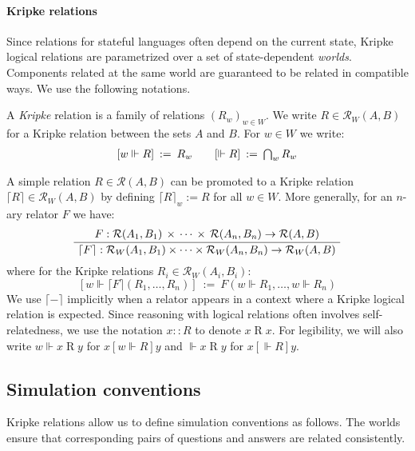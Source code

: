 \documentclass[sigplan,10pt,review]{acmart}
\newcommand{\ifr}[1]{\mathrel{[{#1}]}}
\begin{document}
\paragraph{Kripke relations}

Since relations for stateful languages
often depend on the current state,
Kripke logical relations
are parametrized over a set of state-dependent \emph{worlds}.
Components related at the same world
are guaranteed to be related in compatible ways.
We use the following notations.

\begin{definition} \label{def:klr} %
A \emph{Kripke} relation is
a family of relations $(R_w)_{w \in W}$.
We write $R \in \mathcal{R}_W(A, B)$
for a Kripke relation between the sets $A$ and $B$.
For $w \in W$ we write:
\[
\begin{array}{c@{\qquad}c}
    [w \Vdash R] \: := \: R_w &
    [\Vdash R] \: := \: \bigcap_{w} R_w
\end{array}
\]
\end{definition}

A simple relation $R \in \mathcal{R}(A, B)$
can be promoted to a Kripke relation
$\lceil R \rceil \in \mathcal{R}_W(A, B)$
by defining $\lceil R \rceil_w := R$ for all $w \in W$.
More generally, for an $n$-ary relator $F$ we have:
\[
  \AxiomC{$
    F :
      \mathcal{R}(A_1, B_1) \,\times\,\cdots\,\times\,\mathcal{R}(A_n, B_n)
      \rightarrow \mathcal{R}(A, B)$}
  \UnaryInfC{$
    \lceil F \rceil :
      \mathcal{R}_W(A_1, B_1) \times \cdots \times \mathcal{R}_W(A_n, B_n)
      \rightarrow \mathcal{R}_W(A, B)$}
  \DisplayProof
\]
where for the Kripke relations $R_i \in \mathcal{R}_W(A_i, B_i)$:
\[
  [w \Vdash \lceil F \rceil (R_1, \ldots, R_n)] \: := \:
    F(w \Vdash R_1, \ldots, w \Vdash R_n)
\]
We use $\lceil - \rceil$ implicitly
when a relator appears in a context where
a Kripke logical relation is expected.
Since reasoning with logical relations
often involves self-relatedness,
we use the notation
$x :: R$ to denote $x \mathrel{R} x$.
For legibility, we will also write
$w \Vdash x \mathrel{R} y$ for $x \ifr{w \Vdash R} y$
and $\Vdash x \mathrel{R} y$ for $x \ifr{\Vdash R} y$.


\subsection{Simulation conventions} \label{sec:simconv} %

Kripke relations allow us
to define simulation conventions as follows.
The worlds ensure that corresponding pairs of
questions and answers are related consistently.
\end{document}
